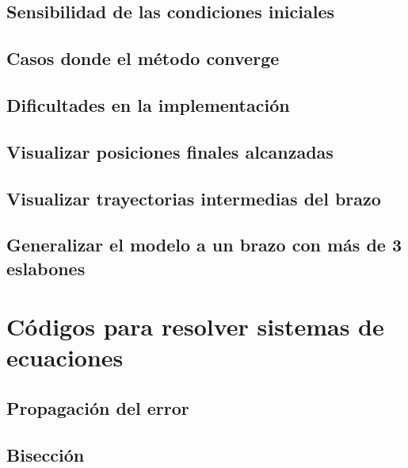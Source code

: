 \documentclass[aspectratio=169,usenames,dvipsnames,spanish]{beamer}
\begin{document}
\subsection{Sensibilidad de las condiciones iniciales}
\subsection{Casos donde el método converge}
\subsection{Dificultades en la implementación}


\subsection{Visualizar posiciones finales alcanzadas}
\subsection{Visualizar trayectorias intermedias del brazo}


\subsection{Generalizar el modelo a un brazo con más de 3 eslabones}



\section{Códigos para resolver sistemas de ecuaciones}
\subsection{Propagación del error}


\subsection{Bisección}

\end{document}
